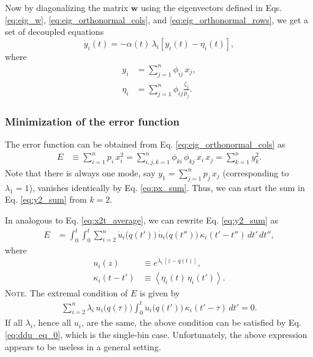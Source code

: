 \documentclass[reprint]{revtex4-1}
\newcommand{\note}[1]{{\color{DarkGreen}\footnotesize \textsc{Note.} #1}}
\newcommand{\Err}{E}
\begin{document}
Now by diagonalizing the matrix $\mathbf w$
using the eigenvectors defined in Eqs. \eqref{eq:eig_w},
\eqref{eq:eig_orthonormal_cols},
and
\eqref{eq:eig_orthonormal_rows},
we get a set of decoupled equations
%
\begin{equation}
\dot y_i(t)
=
-\alpha(t) \, \lambda_i
[y_i(t) - \eta_i(t)],
\label{eq:yt_diffeq}
\end{equation}
%
where
\begin{align}
  y_i &= \sum_{j=1}^n \phi_{ij} \, x_j,
  \label{eq:y_def}
  \\
  \eta_i &= \sum_{j=1}^n \phi_{ij} \frac{ \zeta_j}{ p_j}.
  \label{eq:eta_def}
\end{align}



\subsubsection{Minimization of the error function}



The error function can be obtained
from Eq. \eqref{eq:eig_orthonormal_cols}
as
\begin{align}
  \Err
  &\equiv
  \sum_{i = 1}^n p_i \, x_i^2
  =
  \sum_{i, j, k=1}^n \phi_{ki} \, \phi_{kj} \, x_i \, x_j
  =
  \sum_{k = 1}^n y_k^2.
  \label{eq:y2_sum}
\end{align}
%
Note that there is always one mode, say
$y_1 = \sum_{j=1}^n p_j \, x_j$
(corresponding to $\lambda_1 = 1$),
vanishes identically by Eq. \eqref{eq:px_sum}.
%
Thus, we can start the sum in Eq. \eqref{eq:y2_sum}
from $k = 2$.



In analogous to Eq. \eqref{eq:x2t_average},
we can rewrite Eq. \eqref{eq:y2_sum} as
%
\begin{align}
  \Err
  &=
  \int_0^t \int_0^t
  \sum_{i = 2}^n
  \dot u_i\bigl( q(t') \bigr) \,
  \dot u_i\bigl( q(t'') \bigr) \,
  \kappa_i(t' - t'') \, dt' \, dt'',
  \label{eq:error_mbin}
\end{align}
%
where
\begin{align*}
  u_i(z)
  &\equiv
  e^{\lambda_i \, [z - q(t)]},
  \\
  \kappa_i(t - t')
  &\equiv
  \left\langle
    \eta_i(t) \, \eta_i(t')
  \right\rangle.
\end{align*}
%
\note{The extremal condition of $\Err$ is given by
%
\begin{align}
\sum_{i=2}^n
\lambda_i \, u_i\bigl( q(\tau) \bigr)
\int_0^t
\ddot u_i\bigl( q(t') \bigr) \, \kappa_i(t' - \tau) \, dt' = 0.
\label{eq:optimal_mbin}
\end{align}
%
If all $\lambda_i$, hence all $u_i$, are the same,
the above condition can be satisfied
by Eq. \eqref{eq:ddu_eq_0},
which is the single-bin case.
%
Unfortunately, the above expression
appears to be useless in a general setting.
}
\end{document}
